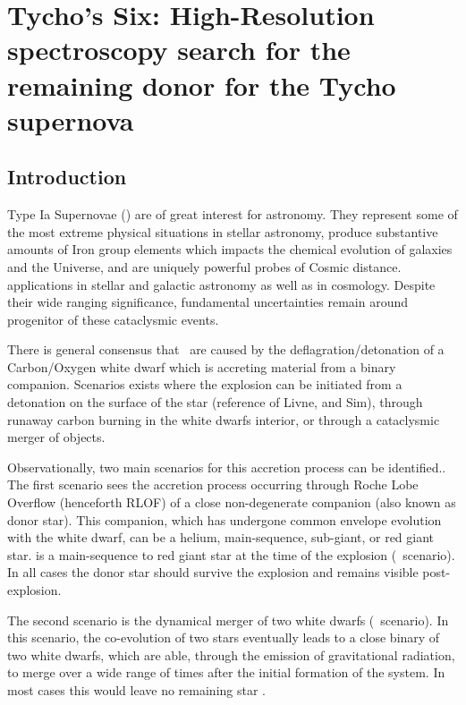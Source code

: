 \chapter{Tycho's Six: High-Resolution spectroscopy search for the remaining donor for the Tycho supernova}
\label{chap:sn1572_hires}


\section{Introduction}
\label{sec:introduction}

Type Ia Supernovae (\sneia) are of great interest for astronomy. They represent some of the most extreme physical situations in stellar astronomy, produce substantive amounts of Iron group elements which impacts the chemical evolution of galaxies and the Universe, and are uniquely powerful probes of Cosmic distance.
applications in stellar and galactic astronomy as well as in cosmology. Despite their wide ranging significance, fundamental uncertainties remain around  progenitor of these cataclysmic events. 

There is general consensus that \sneia\ are caused by the deflagration/detonation of a Carbon/Oxygen white dwarf which is accreting material from a binary companion. Scenarios exists where the explosion can be initiated from a detonation on the surface of the star (reference of Livne, and Sim), through runaway carbon burning in the white dwarfs interior, or through a cataclysmic merger of objects.

Observationally, two main scenarios for this accretion process can be identified.. The first scenario sees the accretion process occurring through Roche Lobe Overflow (henceforth RLOF) of a close non-degenerate companion (also known as donor star). This companion, which has undergone common envelope evolution with the white dwarf, can be a helium, main-sequence, sub-giant, or red giant star. is a main-sequence to red giant star at the time of the explosion (\sd\ scenario). In all cases the donor star should survive the explosion and remains visible post-explosion.

The second scenario is the  dynamical merger of two white dwarfs (\dd\ scenario). In this scenario, the co-evolution of two stars eventually leads to a close binary of two white dwarfs, which are able, through the emission of gravitational radiation, to merge over a wide range of times after the initial formation of the system. In most cases this would leave no remaining star \citep[e.g.][]{2010Natur.463...61P}.

